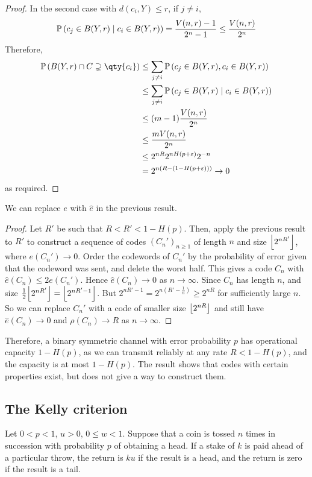 \begin{proof}
    In the second case with $d(c_i,Y) \leq r$, if $j \neq i$,
    \[ \prob{c_j \in B(Y,r) \mid c_i \in B(Y,r)} = \frac{V(n,r) - 1}{2^n - 1} \leq \frac{V(n,r)}{2^n} \]
    Therefore,
    \begin{align*}
        \prob{B(Y,r) \cap C \supsetneq \qty{c_i}} &\leq \sum_{j \neq i} \prob{c_j \in B(Y,r), c_i \in B(Y,r)} \\
        &\leq \sum_{j \neq i} \prob{c_j \in B(Y,r) \mid c_i \in B(Y,r)} \\
        &\leq (m-1) \frac{V(n,r)}{2^n} \\
        &\leq \frac{mV(n,r)}{2^n} \\
        &\leq 2^{nR} 2^{nH(p+\varepsilon)} 2^{-n} \\
        &= 2^{n(R - (1 - H(p+\varepsilon)))} \to 0
    \end{align*}
    as required.
\end{proof}
\begin{proposition}
    We can replace $e$ with $\hat e$ in the previous result.
\end{proposition}
\begin{proof}
    Let $R'$ be such that $R < R' < 1 - H(p)$.
    Then, apply the previous result to $R'$ to construct a sequence of codes $(C_n')_{n \geq 1}$ of length $n$ and size $\floor*{2^{nR'}}$, where $e(C_n') \to 0$.
    Order the codewords of $C_n'$ by the probability of error given that the codeword was sent, and delete the worst half.
    This gives a code $C_n$ with $\hat e(C_n) \leq 2 e(C_n')$.
    Hence $\hat e(C_n) \to 0$ as $n \to \infty$.
    Since $C_n$ has length $n$, and size $\frac{1}{2} \floor*{2^{nR'}} = \floor*{2^{nR' - 1}}$.
    But $2^{nR' - 1} = 2^{n(R' - \frac{1}{n})} \geq 2^{nR}$ for sufficiently large $n$.
    So we can replace $C_n'$ with a code of smaller size $\floor*{2^{nR}}$ and still have $\hat e(C_n) \to 0$ and $\rho(C_n) \to R$ as $n \to \infty$.
\end{proof}
Therefore, a binary symmetric channel with error probability $p$ has operational capacity $1 - H(p)$, as we can transmit reliably at any rate $R < 1 - H(p)$, and the capacity is at most $1 - H(p)$.
The result shows that codes with certain properties exist, but does not give a way to construct them.

\subsection{The Kelly criterion}
Let $0 < p < 1$, $u > 0$, $0 \leq w < 1$.
Suppose that a coin is tossed $n$ times in succession with probability $p$ of obtaining a head.
If a stake of $k$ is paid ahead of a particular throw, the return is $ku$ if the result is a head, and the return is zero if the result is a tail.

